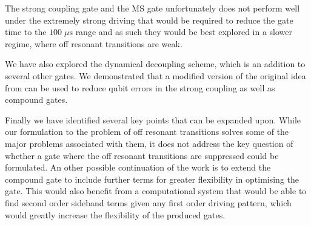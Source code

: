 \documentclass[12pt,twoside]{report}
\begin{document}
The strong coupling gate and the MS gate unfortunately does not perform well under the extremely strong driving that would be required to reduce the gate time to the $100\;\mu\text{s}$ range and as such they would be best explored in a slower regime, where off resonant transitions are weak.

We have also explored the dynamical decoupling scheme, which is an addition to several other gates. We demonstrated that a modified version of the original idea from \cite{DD_Paper} can be used to reduce qubit errors in the strong coupling as well as compound gates.

Finally we have identified several key points that can be expanded upon. While our formulation to the problem of off resonant transitions solves some of the major problems associated with them, it does not address the key question of whether a gate where the off resonant transitions are suppressed could be formulated. An other possible continuation of the work is to extend the compound gate to include further terms for greater flexibility in optimising the gate. This would also benefit from a computational system that would be able to find second order sideband terms given any first order driving pattern, which would greatly increase the flexibility of the produced gates.



\end{document}
